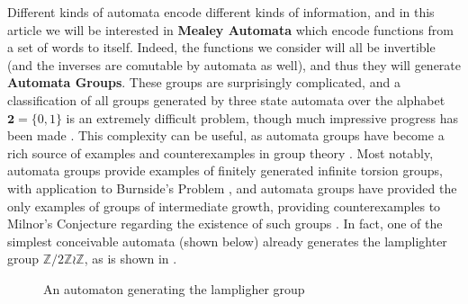 \documentclass[final]{ws-ijac}
\newcommand{\Z}{\mathbb{Z}}
\newcommand{\2}{\textbf{2}}
\begin{document}
Different kinds of automata encode different kinds of information, and
in this article we will be interested in \textbf{Mealey Automata} which encode
functions from a set of words to itself. Indeed, the functions we consider
will all be invertible (and the inverses are comutable by automata as well),
and thus they will generate \textbf{Automata Groups}.
These groups are surprisingly complicated, and a classification of all groups 
generated by three state automata over the alphabet $\2 = \{0,1\}$ is an 
extremely difficult problem, though much impressive progress has been 
made \cite{Bondarenko09:three_state}. This complexity can be useful, 
as automata groups have become a rich source of examples and counterexamples
in group theory
\cite{Nekrashevych05:self_similar_groups%
     ,Sidki00:one_rooted_trees%
     ,GrigorchukNS00:automata_groups%
     }. 
Most notably, automata groups provide examples of finitely generated 
infinite torsion groups, with application to 
Burnside's Problem \cite{Gupta83:burnside}, and automata groups have
provided the only examples of groups of intermediate growth, providing 
counterexamples to Milnor's Conjecture regarding the existence of such groups
\cite{Grigorchuk11:Milnor}. In fact, one of the simplest conceivable automata 
(shown below) already generates the lamplighter group $\Z/2\Z \wr \Z$, as
is shown in \cite{GrigorchukZuk01:lamplighter}.

\begin{figure}
\begin{center}
\end{center}

\caption{An automaton generating the lampligher group}
\label{fig:1}
\end{figure}
\end{document}
